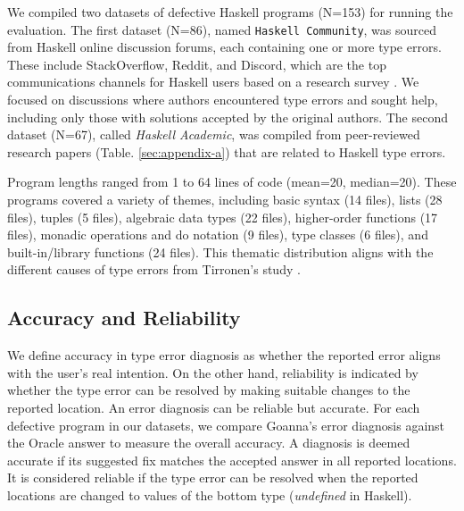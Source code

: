 \documentclass[pdflatex,lineno,sn-nature,Numbered]{sn-jnl}%
\begin{document}
We compiled two datasets of defective Haskell programs (N=153) for running the evaluation. The first dataset (N=86), named \texttt{Haskell Community}, was sourced from Haskell online discussion forums, each containing one or more type errors. These include StackOverflow, Reddit, and Discord, which are the top communications channels for Haskell users based on a research survey \cite{Fausak2022-zf}. We focused on discussions where authors encountered type errors and sought help, including only those with solutions accepted by the original authors. The second dataset (N=67), called \textit{Haskell Academic}, was compiled from peer-reviewed research papers (Table. \ref{sec:appendix-a}) that are related to Haskell type errors.

Program lengths ranged from 1 to 64 lines of code (mean=20, median=20). These programs covered a variety of themes, including basic syntax (14 files), lists (28 files), tuples (5 files), algebraic data types (22 files), higher-order functions (17 files), monadic operations and do notation (9 files), type classes (6 files), and built-in/library functions (24 files). This thematic distribution aligns with the different causes of type errors from Tirronen's study \cite{Tirronen2015-nr}.



\subsection{Accuracy and Reliability} \label{sub:eval-accuracy}

We define accuracy in type error diagnosis as whether the reported error aligns with the user's real intention. On the other hand, reliability is indicated by whether the type error can be resolved by making suitable changes to the reported location. An error diagnosis can be reliable but accurate. For each defective program in our datasets, we compare Goanna's error diagnosis against the Oracle answer to measure the overall accuracy. A diagnosis is deemed accurate if its suggested fix matches the accepted answer in all reported locations. It is considered reliable if the type error can be resolved when the reported locations are changed to values of the bottom type (\textit{undefined} in Haskell).
\end{document}
